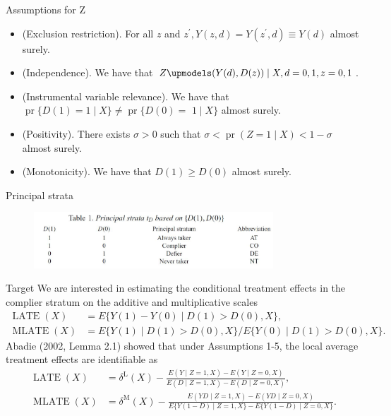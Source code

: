 \documentclass[aspectratio=169,xcolor=dvipsnames]{beamer}
\begin{document}
\begin{frame}{Assumptions for Z}
\begin{itemize}
    \item (Exclusion restriction). For all $z$ and $z^{\prime}, Y(z, d)=Y\left(z^{\prime}, d\right) \equiv Y(d)$ almost surely.
\item (Independence). We have that $Z \upmodels (Y(d), D(z)) \mid X, d=0,1, z=0,1$.
\item (Instrumental variable relevance). We have that $\operatorname{pr}\{D(1)=1 \mid X\} \neq \operatorname{pr}\{D(0)=$ $1 \mid X\}$ almost surely.
\item (Positivity). There exists $\sigma>0$ such that $\sigma<\operatorname{pr}(Z=1 \mid X)<1-\sigma$ almost surely.
\item (Monotonicity). We have that $D(1) \geqslant D(0)$ almost surely.
\end{itemize}
\end{frame}

\begin{frame}{Principal strata}
\begin{figure}
    \centering
    \includegraphics[width=0.8\textwidth]{figure/fig3.JPG}
\end{figure}
\end{frame}

\begin{frame}{Target}
We are interested in estimating the conditional treatment effects in the complier stratum on the additive and multiplicative scales\\
$$
\begin{aligned}
\operatorname{LATE}(X) &=E\{Y(1)-Y(0) \mid D(1)>D(0), X\}, \\
\operatorname{MLATE}(X) &=E\{Y(1) \mid D(1)>D(0), X\} / E\{Y(0) \mid D(1)>D(0), X\} .
\end{aligned}
$$
Abadie (2002, Lemma 2.1) showed that under Assumptions 1-5, the local average treatment effects are identifiable as
$$
\begin{aligned}
\operatorname{LATE}(X)&=\delta^{\mathrm{L}}(X) - \frac{E(Y \mid Z=1, X)-E(Y \mid Z=0, X)}{E(D \mid Z=1, X)-E(D \mid Z=0, X)},\\
\operatorname{MLATE}(X)&=\delta^{\mathrm{M}}(X) - \frac{E(Y D \mid Z=1, X)-E(Y D \mid Z=0, X)}{E\{Y(1-D) \mid Z=1, X\}-E\{Y(1-D) \mid Z=0, X\}}.
\end{aligned}
$$
\end{frame}
\end{document}
